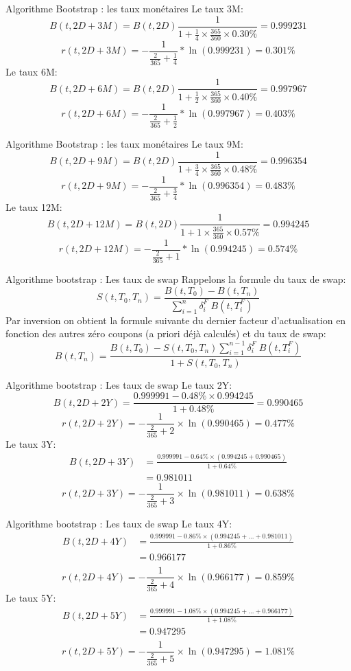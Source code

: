 \documentclass{beamer}
\begin{document}
\begin{frame}{Algorithme Bootstrap : les taux monétaires}
Le taux 3M:
\[
B(t,2D+3M)=B(t,2D)\frac{1}{1+\frac{1}{4} \times \frac{365}{360}  \times 0.30\%}=0.999231
\]
\[r(t,2D+3M)=-\frac{1}{\frac{2}{365}+\frac{1}{4}}*\ln(0.999231)=0.301\%
\]
Le taux 6M:
\[
B(t,2D+6M)=B(t,2D)\frac{1}{1+\frac{1}{2} \times \frac{365}{360}  \times 0.40\%}=0.997967
\]
\[r(t,2D+6M)=-\frac{1}{\frac{2}{365}+\frac{1}{2}}*\ln(0.997967)=0.403\%
\]
\end{frame}

\begin{frame}{Algorithme Bootstrap : les taux monétaires}
Le taux 9M:
\[
B(t,2D+9M)=B(t,2D)\frac{1}{1+\frac{3}{4} \times \frac{365}{360}  \times 0.48\%}=0.996354
\]
\[r(t,2D+9M)=-\frac{1}{\frac{2}{365}+\frac{3}{4}}*\ln(0.996354)=0.483\%
\]
Le taux 12M:
\[
B(t,2D+12M)=B(t,2D)\frac{1}{1+1 \times \frac{365}{360}  \times 0.57\%}=0.994245
\]
\[r(t,2D+12M)=-\frac{1}{\frac{2}{365}+1}*\ln(0.994245)=0.574\%
\]
\end{frame}

\begin{frame}{Algorithme bootstrap : Les taux de swap}
Rappelons la formule du taux de swap:
\[
S(t,T_0,T_n)=\frac{B(t,T_0)-B(t,T_n)}{ \sum_{i=1}^{n}\delta_i^F \;B(t,T_i^F)}
\]
Par inversion on obtient la formule suivante du dernier facteur d'actualisation en fonction des autres zéro coupons (a priori déjà calculés) et du taux de swap:
\[
B(t,T_n)=\frac{B(t,T_0)-S(t,T_0,T_n)\sum_{i=1}^{n-1}\delta_i^F \;B(t,T_i^F)}{1+S(t,T_0,T_n)}
\]
\end{frame}

\begin{frame}{Algorithme bootstrap : Les taux de swap}
Le taux 2Y:
\[
B(t,2D+2Y)=\frac{0.999991-0.48\% \times 0.994245}{1+0.48\%}=0.990465
\]
\[
r(t,2D+2Y)=-\frac{1}{\frac{2}{365}+2} \times \ln(0.990465)=0.477\%
\]
Le taux 3Y:
\[
\begin{split}
B(t,2D+3Y)&=\frac{0.999991-0.64\% \times (0.994245 + 0.990465)}{1+0.64\%}\\
&=0.981011
\end{split}
\]
\[
r(t,2D+3Y)=-\frac{1}{\frac{2}{365}+3} \times \ln(0.981011)=0.638\%
\]
\end{frame}

\begin{frame}{Algorithme bootstrap : Les taux de swap}
Le taux 4Y:
\[
\begin{split}
B(t,2D+4Y)&=\frac{0.999991-0.86\%  \times (0.994245 + ... + 0.981011)}{1+0.86\%}\\
&=0.966177\\
\end{split}
\]
\[
r(t,2D+4Y)=-\frac{1}{\frac{2}{365}+4} \times \ln(0.966177)=0.859\%
\]
Le taux 5Y:
\[
\begin{split}
B(t,2D+5Y)&=\frac{0.999991-1.08\% \times \left(0.994245 + ... + 0.966177\right)}{1+1.08\%}\\
&=0.947295\\
\end{split}
\]
\[
r(t,2D+5Y)=-\frac{1}{\frac{2}{365}+5} \times \ln(0.947295)=1.081\%
\]
\end{frame}
\end{document}

